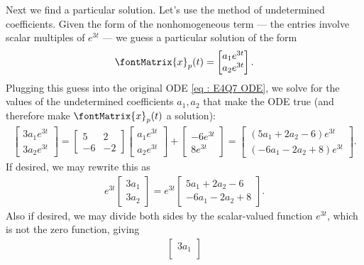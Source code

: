 {Next we find a particular solution. Let's use the method of undetermined coefficients. Given the form of the nonhomogeneous term --- the entries involve scalar multiples of $e^{3 t}$ --- we guess a particular solution of the form
\begin{align*}
\fontMatrix{x}_{p}(t)
=
\begin{bmatrix}%
a_{1} e^{3 t}	\\
a_{2} e^{3 t}
\end{bmatrix}%
.
\end{align*}
Plugging this guess into the original ODE \eqref{eq : E4Q7 ODE}, we solve for the values of the undetermined coefficients $a_{1},a_{2}$ that make the ODE true (and therefore make $\fontMatrix{x}_{p}(t)$ a solution):
\begin{align*}
\begin{bmatrix}%
3 a_{1} e^{3 t}	\\
3 a_{2} e^{3 t}
\end{bmatrix}%
=
\begin{bmatrix}%
5	&	2	\\
-6	&	-2
\end{bmatrix}%
\begin{bmatrix}%
a_{1} e^{3 t}	\\
a_{2} e^{3 t}
\end{bmatrix}%
+
\begin{bmatrix}%
-6 e^{3 t}	\\
8 e^{3 t}
\end{bmatrix}%
=
\begin{bmatrix}%
(5 a_{1} + 2 a_{2} - 6) e^{3 t}	\\
(-6 a_{1} - 2 a_{2} + 8) e^{3 t}
\end{bmatrix}%
.
\end{align*}
If desired, we may rewrite this as
\begin{align*}
e^{3 t}
\begin{bmatrix}%
3 a_{1}	\\
3 a_{2}
\end{bmatrix}%
=
e^{3 t}
\begin{bmatrix}%
5 a_{1} + 2 a_{2} - 6	\\
-6 a_{1} - 2 a_{2} + 8
\end{bmatrix}%
.
\end{align*}
Also if desired, we may divide both sides by the scalar-valued function $e^{3 t}$, which is not the zero function, giving
\begin{align*}
\begin{bmatrix}%
3 a_{1}	\\

\end{bmatrix}
\end{align*}}
